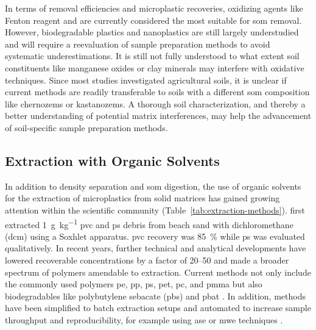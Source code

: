 In terms of removal efficiencies and microplastic recoveries, oxidizing agents like Fenton reagent and 
are currently considered the most suitable for \ac{som} removal. However,
biodegradable plastics and nanoplastics are still largely understudied and will require a reevaluation of sample preparation methods to avoid systematic underestimations. It is still not fully understood to what extent soil constituents like manganese oxides or clay minerals may interfere with oxidative techniques. Since most studies investigated agricultural soils, it is unclear if current methods are readily transferable to soils with a different \ac{som} composition like chernozems or kastanozems. A thorough soil characterization, and thereby a better understanding of potential matrix interferences, may help the advancement of soil-specific sample preparation methods.

\subsection{Extraction with Organic	Solvents}
\label{sec:analytical-techniques:solvent-extraction}

In addition to density separation and \ac{som} digestion, the use of organic solvents for the extraction of microplastics from solid matrices has gained growing attention within the scientific community
(Table~\ref{tab:extraction-methods}).  first extracted \SI{1}{\gram\per\kilo\gram} \ac{pvc} and \ac{ps} debris from beach sand with dichloromethane (\ac{dcm}) using a Soxhlet apparatus.
\Ac{pvc} recovery was \SI{85}{\percent} while \ac{ps} was evaluated qualitatively. In recent years, further technical and analytical developments have lowered recoverable concentrations by a factor of 20--50 \citep[Chapter~\ref{ch:py-gc-ms-method};][]{PeezQuantitative2019,DierkesQuantification2019} and made a broader spectrum of polymers amendable to extraction. Current methods not only include the commonly used polymers \ac{pe}, \ac{pp}, \ac{ps}, \ac{pet}, \ac{pc}, and \ac{pmma} \citep{FullerProcedure2016,OkoffoIdentification2020} but also biodegradables like polybutylene sebacate (\ac{pbs}) and \ac{pbat} \citep{SiottoMonitoring2013,NelsonQuantification2019}.
In addition, methods have been simplified to batch extraction setups \citep[Chapter~\ref{ch:py-gc-ms-method};][]{ElertComparison2017} and automated to increase sample throughput and reproducibility, for example using \ac{ase} \citep{FullerProcedure2016,OkoffoIdentification2020} or \ac{mwe} techniques \citep{LaNasaMicrowaveassisted2020}.

